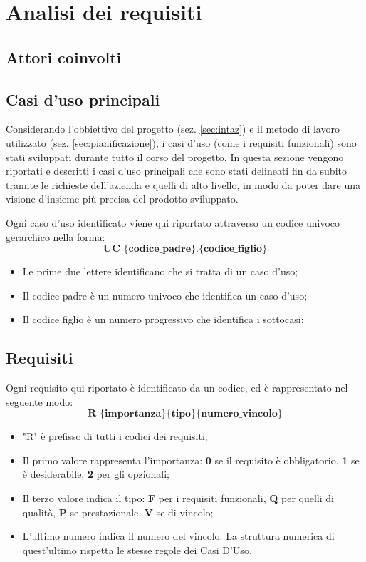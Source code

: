 
\chapter{Analisi dei requisiti}\label{chap:requirements}

\section{Attori coinvolti}
\section{Casi d'uso principali}
Considerando l'obbiettivo del progetto (sez. \ref{sec:intaz}) e il metodo di lavoro utilizzato (sez. \ref{sec:pianificazione}), i casi d'uso (come i requisiti funzionali) sono stati sviluppati durante tutto il corso del progetto. In questa sezione vengono riportati e descritti i casi d'uso principali che sono stati delineati fin da subito tramite le richieste dell'azienda e quelli di alto livello, in modo da poter dare una visione d’insieme più precisa del prodotto sviluppato.

Ogni caso d'uso identificato viene qui riportato attraverso un codice univoco gerarchico nella forma:
$$ \textbf{UC \{codice\_padre\}.\{codice\_figlio\}  } $$
\begin{itemize}
	\item Le prime due lettere identificano che si tratta di un caso d'uso;
	\item Il codice padre è un numero univoco che identifica un caso d'uso;
	\item Il codice figlio è un numero progressivo che identifica i sottocasi;\\
\end{itemize}



\section{Requisiti}
Ogni requisito qui riportato è identificato da un codice, ed è rappresentato nel seguente modo:
$$ \textbf{R \{importanza\}\{tipo\}\{numero\_vincolo\} } $$

\begin{itemize}
	\item "R" è prefisso di tutti i codici dei requisiti;
	\item Il primo valore rappresenta l'importanza: \textbf{0} se il requisito è obbligatorio, \textbf{1} se è desiderabile, \textbf{2} per gli opzionali;
	\item Il terzo valore indica il tipo: \textbf{F} per i requisiti funzionali, \textbf{Q} per quelli di qualità, \textbf{P} se prestazionale, \textbf{V} se di vincolo;
	\item L'ultimo numero indica il numero del vincolo. La struttura numerica di quest'ultimo rispetta le stesse regole dei Casi D'Uso.
\end{itemize}

